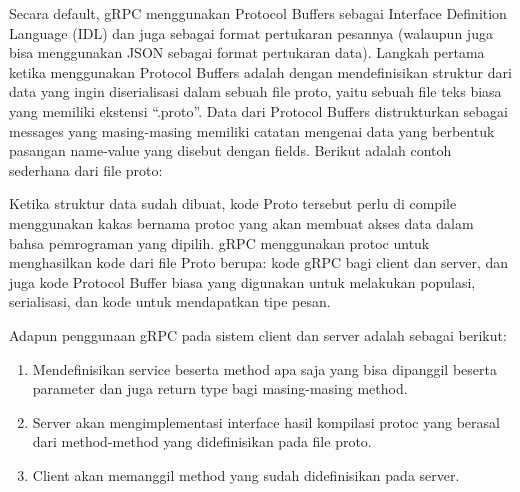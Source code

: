 Secara default, gRPC menggunakan Protocol Buffers sebagai Interface Definition Language (IDL) dan juga sebagai format pertukaran pesannya (walaupun juga bisa menggunakan JSON sebagai format pertukaran data).
Langkah pertama ketika menggunakan Protocol Buffers adalah dengan mendefinisikan struktur dari data yang ingin diserialisasi dalam sebuah file proto, yaitu sebuah file teks biasa yang memiliki ekstensi “.proto”.
Data dari Protocol Buffers distrukturkan sebagai messages yang masing-masing memiliki catatan mengenai data yang berbentuk pasangan name-value yang disebut dengan fields.
Berikut adalah contoh sederhana dari file proto:


Ketika struktur data sudah dibuat, kode Proto tersebut perlu di compile menggunakan kakas bernama protoc yang akan membuat akses data dalam bahsa pemrograman yang dipilih.
gRPC menggunakan protoc untuk menghasilkan kode dari file Proto berupa: kode gRPC bagi client dan server, dan juga kode Protocol Buffer biasa yang digunakan untuk melakukan populasi, serialisasi, dan kode untuk mendapatkan tipe pesan.

Adapun penggunaan gRPC pada sistem client dan server adalah sebagai berikut:
\begin{enumerate}
	\item Mendefinisikan service beserta method apa saja yang bisa dipanggil beserta parameter dan juga return type bagi masing-masing method.
	\item  Server akan mengimplementasi interface hasil kompilasi protoc yang berasal dari method-method yang didefinisikan pada file proto.
	\item Client akan memanggil method yang sudah didefinisikan pada server.
\end{enumerate}



